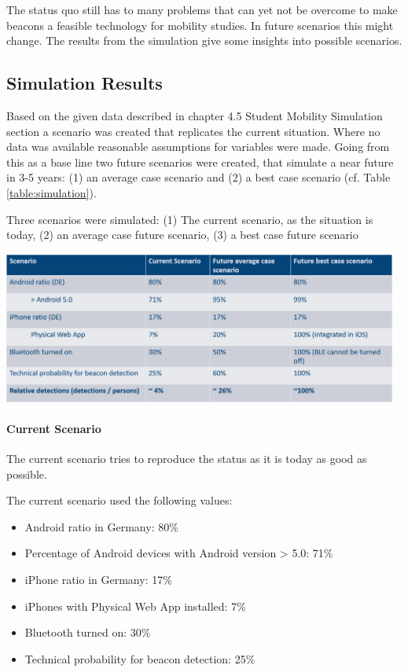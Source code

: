 The status quo still has to many problems that can yet not be overcome to make beacons a feasible technology for mobility studies. In future scenarios this might change. The results from the simulation give some insights into possible scenarios. 

\subsection{Simulation Results}

Based on the given data described in chapter 4.5 Student Mobility Simulation section a scenario was created that replicates the current situation. Where no data was available reasonable assumptions for variables were made.
Going from this as a base line two future scenarios were created, that simulate a near future in 3-5 years: (1) an average case scenario and (2) a best case scenario (cf. Table \ref{table:simulation}).

\begin{table}[htbp]\centering
\caption{Simulated Scenarios about Beacon Detection}
\footnotesize {Three scenarios were simulated: (1) The current scenario, as the situation is today, (2) an average case future scenario, (3) a best case future scenario}
\label{table:simulation}
\end {table}
\includegraphics[height=50mm]{evaluation/images/table_simulation}
	
\paragraph{Current Scenario}

The current scenario tries to reproduce the status as it is today as good as possible. 

The current scenario used the following values:
\begin{itemize}
\item Android ratio in Germany: 80\%
\item Percentage of Android devices with Android version > 5.0: 71\%
\item iPhone ratio in Germany: 17\%
\item iPhones with Physical Web App installed: 7\%
\item Bluetooth turned on: 30\%
\item Technical probability for beacon detection: 25\%
\end{itemize}

